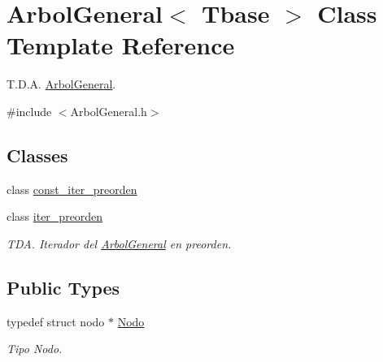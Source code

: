 \hypertarget{classArbolGeneral}{\section{Arbol\-General$<$ Tbase $>$ Class Template Reference}
\label{classArbolGeneral}
}


T.\-D.\-A. \hyperlink{classArbolGeneral}{Arbol\-General}.  




{\ttfamily \#include $<$Arbol\-General.\-h$>$}

\subsection*{Classes}
\begin{DoxyCompactItemize}
\item 
class \hyperlink{classArbolGeneral_1_1const__iter__preorden}{const\-\_\-iter\-\_\-preorden}
\item 
class \hyperlink{classArbolGeneral_1_1iter__preorden}{iter\-\_\-preorden}
\begin{DoxyCompactList}\small\item\em T\-D\-A. Iterador del \hyperlink{classArbolGeneral}{Arbol\-General} en preorden. \end{DoxyCompactList}\end{DoxyCompactItemize}
\subsection*{Public Types}
\begin{DoxyCompactItemize}
\item 
typedef struct nodo $\ast$ \hyperlink{classArbolGeneral_a12cc1b74a9095d89bc7334290d332f7a}{Nodo}
\begin{DoxyCompactList}\small\item\em Tipo Nodo. \end{DoxyCompactList}\end{DoxyCompactItemize}
